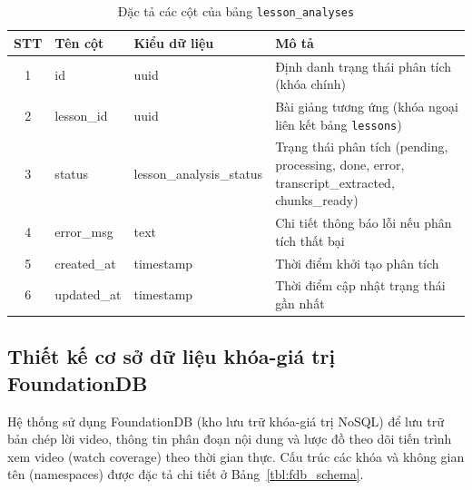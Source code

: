 \documentclass[../DoAn.tex]{subfiles}
\begin{document}
\begin{table}[H]
\centering
\small
\renewcommand{\arraystretch}{1.3}
\begin{tabular}{|c|l|l|p{6.2cm}|}
\hline
\textbf{STT} & \textbf{Tên cột} & \textbf{Kiểu dữ liệu} & \textbf{Mô tả} \\ \hline
1 & id & uuid & Định danh trạng thái phân tích (khóa chính) \\ \hline
2 & lesson\_id & uuid & Bài giảng tương ứng (khóa ngoại liên kết bảng \texttt{lessons}) \\ \hline
3 & status & lesson\_analysis\_status & Trạng thái phân tích (pending, processing, done, error, transcript\_extracted, chunks\_ready) \\ \hline
4 & error\_msg & text & Chi tiết thông báo lỗi nếu phân tích thất bại \\ \hline
5 & created\_at & timestamp & Thời điểm khởi tạo phân tích \\ \hline
6 & updated\_at & timestamp & Thời điểm cập nhật trạng thái gần nhất \\ \hline
\end{tabular}
\caption{Đặc tả các cột của bảng \texttt{lesson\_analyses}}
\label{tbl:lesson_analyses}
\end{table}

\subsection{Thiết kế cơ sở dữ liệu khóa-giá trị FoundationDB}
Hệ thống sử dụng FoundationDB (kho lưu trữ khóa-giá trị NoSQL) để lưu trữ bản chép lời video, thông tin phân đoạn nội dung và lược đồ theo dõi tiến trình xem video (watch coverage) theo thời gian thực. Cấu trúc các khóa và không gian tên (namespaces) được đặc tả chi tiết ở Bảng~\ref{tbl:fdb_schema}.
\end{document}
